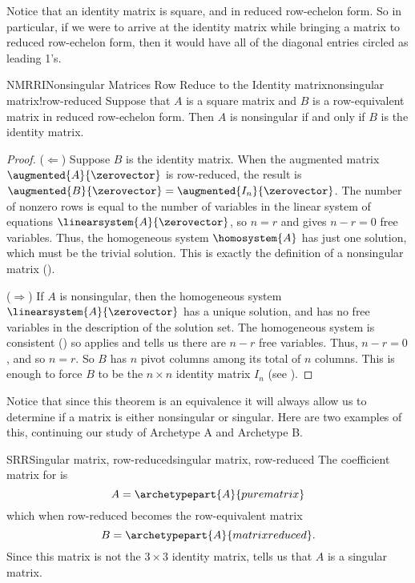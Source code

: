 %
Notice that an identity matrix is square, and in reduced row-echelon form.  So in particular, if we were to arrive at the identity matrix while bringing a matrix to reduced row-echelon form, then it would have all of the diagonal entries circled as leading 1's.
%
%
\begin{theorem}{NMRRI}{Nonsingular Matrices Row Reduce to the Identity matrix}{nonsingular matrix!row-reduced}
Suppose that $A$ is a square matrix and $B$ is a row-equivalent matrix in reduced row-echelon form.  Then $A$ is nonsingular if and only if $B$ is the identity matrix.
\end{theorem}
%
\begin{proof}
($\Leftarrow$)  Suppose $B$ is the identity matrix.  When the augmented matrix $\augmented{A}{\zerovector}$ is row-reduced, the result is $\augmented{B}{\zerovector}=\augmented{I_n}{\zerovector}$.  The number of nonzero rows is equal to the number of variables in the linear system of equations $\linearsystem{A}{\zerovector}$, so $n=r$ and  gives $n-r=0$ free variables.  Thus, the homogeneous system $\homosystem{A}$ has just one solution, which must be the trivial solution.  This is exactly the definition of a nonsingular matrix ().\par
%
($\Rightarrow$)  If $A$ is nonsingular, then the homogeneous system $\linearsystem{A}{\zerovector}$ has a unique solution, and has no free variables in the description of the solution set.  The homogeneous system is consistent () so   applies and tells us there are $n-r$ free variables.  Thus, $n-r=0$, and so $n=r$.  So $B$ has $n$ pivot columns among its total of $n$ columns.  This is enough to force $B$ to be the $n\times n$ identity matrix $I_n$ (see ).
\end{proof}
%
Notice that since this theorem is an equivalence it will always allow us to determine if a matrix is either nonsingular or singular.  Here are two examples of this, continuing our study of Archetype A and Archetype B.
%
\begin{example}{SRR}{Singular matrix, row-reduced}{singular matrix, row-reduced}
The coefficient matrix for  is
%
\begin{equation*}
A=\archetypepart{A}{purematrix}
\end{equation*}
%
which when row-reduced becomes the row-equivalent matrix
%
\begin{equation*}
B=\archetypepart{A}{matrixreduced}.
\end{equation*}
%
Since this matrix is not the $3\times 3$ identity matrix,  tells us that $A$ is a singular matrix.
\end{example}
